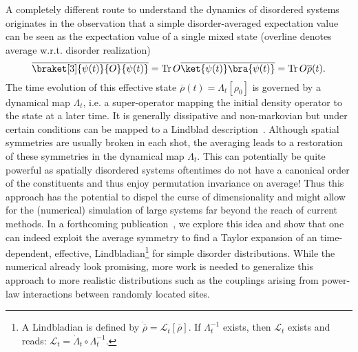 
A completely different route to understand the dynamics of disordered systems originates in the observation that a simple disorder-averaged expectation value can be seen as the expectation value of a single mixed state (overline denotes average w.r.t. disorder realization)
\begin{equation}
	\overline{\braket[3]{\psi(t)}{O}{\psi(t)}} = \Tr O \overline{\ket{\psi(t)}\bra{\psi(t)}} = \Tr O \overline{\rho}(t).
\end{equation}
The time evolution of this effective state $\overline{\rho}(t) = \Lambda_t[\rho_0]$ is governed by a dynamical map $\Lambda_t$, i.e. a super-operator mapping the initial density operator to the state at a later time. It is generally dissipative and non-markovian but under certain conditions can be mapped to a Lindblad description~\cite{kropfEffectiveDynamicsDisordered2016,gneitingIncoherentEnsembleDynamics2016,chenSimulatingOpenQuantum2018,gneitingDisorderdressedQuantumEvolution2020}. 
Although spatial symmetries are usually broken in each shot, the averaging leads to a restoration of these symmetries in the dynamical map $\Lambda_t$. This can potentially be quite powerful as spatially disordered systems oftentimes do not have a canonical order of the constituents and thus enjoy permutation invariance on average! Thus this approach has the potential to dispel the curse of dimensionality and might allow for the (numerical) simulation of large systems far beyond the reach of current methods. In a forthcoming publication~\cite{erpeldingSymmetries}, we explore this idea and show that one can indeed exploit the average symmetry to find a Taylor expansion of an time-dependent, effective, Lindbladian\footnote{A Lindbladian is defined by $\dot{\overline{\rho}} = \mathcal{L}_t[\overline{\rho}]$. If $\Lambda_t^{-1}$ exists, then $\mathcal{L}_t$ exists and reads: $\mathcal{L}_t = \dot{\Lambda}_t\circ\Lambda_t^{-1}$.} for simple disorder distributions. While the numerical already look promising, more work is needed to generalize this approach to more realistic distributions such as the couplings arising from power-law interactions between randomly located sites.


